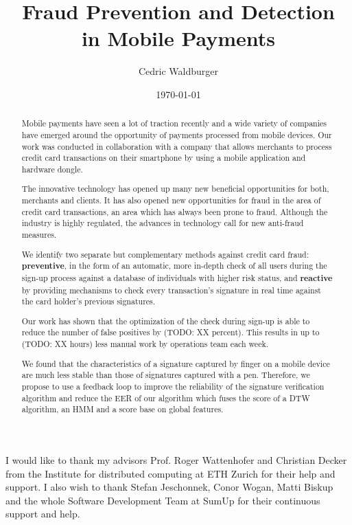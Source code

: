 \documentclass[a4paper, oneside]{csthesis}
\title{Fraud Prevention and Detection\\[5pt] in Mobile Payments}
\author{Cedric Waldburger}
\institute{Distributed Computing Group \\[2pt]
Computer Engineering and Networks Laboratory \\[2pt]
ETH Zurich}
\date{\today}
\begin{document}
\frontmatter
\maketitle %

\cleardoublepage

\begin{acknowledgements}

  I would like to thank my advisors Prof. Roger Wattenhofer and Christian Decker from the Institute for distributed computing at ETH Zurich for their help and support. I also wish to thank Stefan Jeschonnek, Conor Wogan, Matti Biskup and the whole Software Development Team at SumUp for their continuous support and help.

\end{acknowledgements}


\begin{abstract}
    Mobile payments have seen a lot of traction recently and a wide variety of companies have emerged around the opportunity of payments processed from mobile devices. Our work was conducted in collaboration with a company that allows merchants to process credit card transactions on their smartphone by using a mobile application and hardware dongle.

    The innovative technology has opened up many new beneficial opportunities for both, merchants and clients. It has also opened new opportunities for fraud in the area of credit card transactions, an area which has always been prone to fraud. Although the industry is highly regulated, the advances in technology call for new anti-fraud measures.

    We identify two  separate but complementary methods against credit card fraud: \textbf{preventive}, in the form of an automatic, more in-depth check of all users during the sign-up process against a database of individuals with higher risk status, and \textbf{reactive} by providing mechanisms to check every transaction's signature in real time against the card holder's previous signatures.

    Our work has shown that the optimization of the check during sign-up is able to reduce the number of false positives by (TODO: XX percent). This results in up to (TODO: XX hours) less manual work by operations team each week.

    We found that the characteristics of a signature captured by finger on a mobile device are much less stable than those of signatures captured with a pen. Therefore, we propose to use a feedback loop to improve the reliability of the signature verification algorithm and reduce the EER of our algorithm which fuses the score of a DTW algorithm, an HMM and a score base on global features.

\end{abstract}
\end{document}
